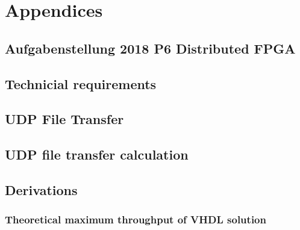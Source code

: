 %
%
\chapter{Appendices}\label{chp:appendices}

\section{Aufgabenstellung 2018 P6 Distributed FPGA} \label{app:aufgabenstellung}


\section{Technicial requirements} \label{app:technicial_requirements}


\section{UDP File Transfer} \label{app:uftspec}


\section{UDP file transfer calculation} \label{app:uftcalc}



\section{Derivations} \label{app:derivations}
\subsection{Theoretical maximum throughput of VHDL solution} \label{app:derivations:theomax}

